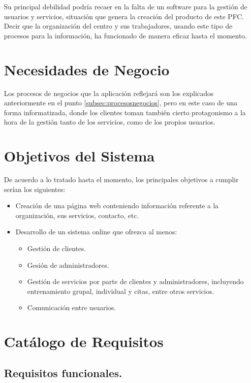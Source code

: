 Su principal debilidad podría recaer en la falta de un software para la gestión de usuarios y servicios, situación que genera la creación del producto de este PFC. Decir que la organización del centro y sus trabajadores, usando este tipo de procesos para la información, ha funcionado de manera eficaz hasta el momento.


\section{Necesidades de Negocio}

Los procesos de negocios que la aplicación reflejará son los explicados anteriormente en el punto \ref{subsec:procesosnegocios}, pero en este caso de una forma informatizada, donde los clientes toman también cierto protagonismo a la hora de la gestión tanto de los servicios, como de los propios usuarios.


\section{Objetivos del Sistema}

De acuerdo a lo tratado hasta el momento, los principales objetivos a cumplir serían los siguientes: 

\begin{itemize}
\item Creación de una página web conteniendo información referente a la organización, sus servicios, contacto, etc. 
\item Desarrollo de un sistema online que ofrezca al menos: 
\begin{itemize}
\item Gestión de clientes.
\item Gesión de administradores.
\item Gestión de servicios por parte de clientes y administradores, incluyendo entrenamiento grupal, individual y citas, entre otros servicios.
\item Comunicación entre usuarios.
\end {itemize}
\end{itemize}


\section{Catálogo de Requisitos}\label{sec:catalogo-requisitos}

\subsection{Requisitos funcionales.}\label{subsec:requisitosfuncionales}

